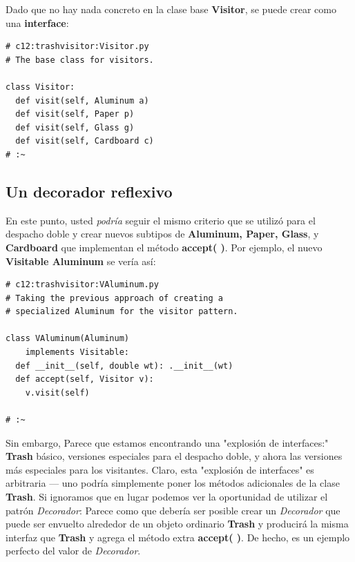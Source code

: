 \documentclass{article}
\begin{document}
Dado que no hay nada concreto en la clase base \textbf{Visitor}, se puede crear como una \textbf{interface}: \newline

\begin{lstlisting} 
# c12:trashvisitor:Visitor.py 
# The base class for visitors. 

class Visitor: 
  def visit(self, Aluminum a) 
  def visit(self, Paper p) 
  def visit(self, Glass g) 
  def visit(self, Cardboard c) 
# :~ 
\end{lstlisting}

\subsection{Un decorador reflexivo}

En este punto, usted \textit{podría} seguir el mismo criterio que se utilizó para el despacho doble y crear nuevos subtipos de \textbf{Aluminum, Paper, Glass}, y \textbf{Cardboard} que implementan el método \textbf{accept( )}. Por ejemplo, el nuevo \textbf{Visitable Aluminum} se vería así: \newline

\begin{lstlisting} 
# c12:trashvisitor:VAluminum.py 
# Taking the previous approach of creating a 
# specialized Aluminum for the visitor pattern. 

class VAluminum(Aluminum)  
    implements Visitable: 
  def __init__(self, double wt): .__init__(wt)  
  def accept(self, Visitor v): 
    v.visit(self) 

# :~ 
\end{lstlisting}

Sin embargo, Parece que estamos encontrando una "explosión de interfaces:" \textbf{Trash} básico, versiones especiales para el despacho doble, y ahora las versiones más especiales para los visitantes. Claro, esta "explosión de interfaces" es arbitraria — uno podría simplemente poner los métodos adicionales de la clase \textbf{Trash}. Si ignoramos que en lugar podemos ver la oportunidad de utilizar el patrón \textit{Decorador}: Parece como que debería ser posible crear un \textit{Decorador} que puede ser envuelto alrededor de un objeto ordinario \textbf{Trash} y producirá la misma interfaz que \textbf{Trash} y agrega el método extra \textbf{accept( )}. De hecho, es un ejemplo perfecto del valor de \textit{Decorador}.         \newline
\end{document}
